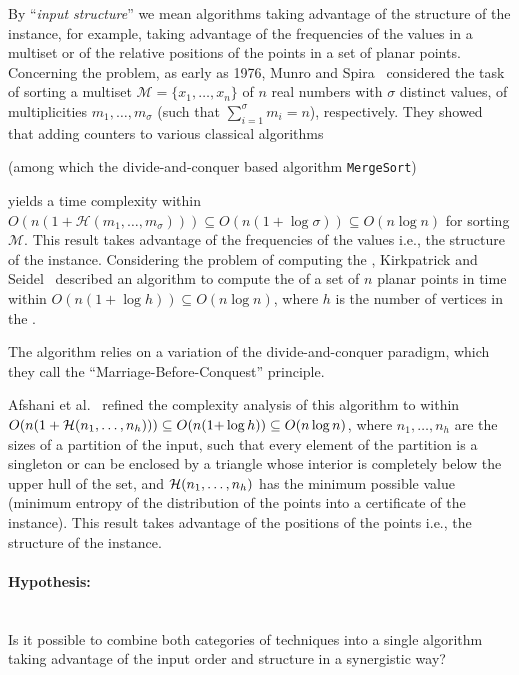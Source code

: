 By ``\emph{input structure}'' we mean algorithms taking advantage of the
structure of the instance, for example, taking advantage of the
frequencies of the values in a multiset or of the relative positions
of the points in a set of planar points.
Concerning the {} problem, as early as 1976, Munro and
Spira~\cite{1976-JComp-SortingAndSearchingInMultisets-MunroSpira}
considered the task of sorting a multiset
$\mathcal{M}=\{x_1, \dots, x_n\}$ of $n$ real numbers with $\sigma$ distinct
values, of multiplicities $m_1, \dots, m_\sigma$ (such that
$\sum_{i=1}^\sigma {m_i}=n$), respectively. They showed that adding
counters to various classical algorithms
\begin{INUTILE}
  (among which the divide-and-conquer based algorithm
  {\tt{MergeSort}})
\end{INUTILE}
yields a time complexity within
$O(n(1+\mathcal{H}(m_1, \dots, m_\sigma))) \subseteq
O(n(1{+}\log{\sigma})) \subseteq O(n\log{n})$ for sorting $\mathcal{M}$. This result takes advantage of the frequencies of the values
i.e., the structure of the instance.
Considering the problem of computing the {}, Kirkpatrick and Seidel~\cite{1986-JCom-TheUltimatePlanarConvexHullAlgorithm-KirkpatrickSeidel} described an algorithm to compute the {} of a set of $n$ planar points in time within $O(n(1+\log h))\subseteq O(n\log n)$, where $h$ is the number of vertices in the {}.
\begin{INUTILE}
  The algorithm relies on a variation of the divide-and-conquer
  paradigm, which they call the ``Marriage-Before-Conquest''
  principle.
\end{INUTILE}
Afshani et al.~\cite{2009-FOCS-InstanceOptimalGeometricAlgorithms-AfshaniBarbayChan} refined the complexity analysis of this algorithm to within $O(n(1+{\cal H}(n_1,\ldots,n_h)))\subseteq O(n(1{+}\log h)) \subseteq O(n\log{n})$, where $n_1, \dots, n_h$ are the sizes of a partition of the input, such that every element of the partition is a singleton or can be enclosed by a triangle whose interior is completely below the upper hull of the set, and ${\cal H}(n_1,\ldots,n_h)$ has the minimum possible value (minimum entropy of the distribution of the points into a certificate of the instance). This result takes advantage of the positions of the points i.e., the structure of the instance.


\paragraph{Hypothesis:}~\\ Is it possible to combine both categories of
techniques into a single algorithm taking advantage of the input order
and structure in a synergistic way?~\\

